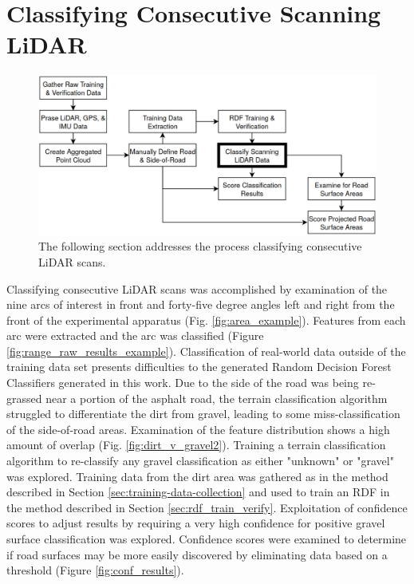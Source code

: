 \documentclass[numbered,pdftex]{ohio-etd}
\begin{document}
{{	} %
		
	\section{Classifying Consecutive Scanning LiDAR}\label{sec:classify_consec_scan_lidar}{
		
		\begin{figure}[H]
			\centering
			\includegraphics[width=0.95\linewidth]{Defense_Images/test_2.png}
			\caption[Classifying Consecutive LiDAR Scans Flowchart Context]{The following section addresses the process classifying consecutive LiDAR scans.}
			\label{fig:test_2.png}
		\end{figure}
			
		{Classifying consecutive LiDAR scans was accomplished by examination of the nine arcs of interest in front and forty-five degree angles left and right from the front of the experimental apparatus (Fig. \ref{fig:area_example}). Features from each arc were extracted and the arc was classified (Figure \ref{fig:range_raw_results_example}). Classification of real-world data outside of the training data set presents difficulties to the generated Random Decision Forest Classifiers generated in this work. Due to the side of the road was being re-grassed near a portion of the asphalt road, the terrain classification algorithm struggled to differentiate the dirt from gravel, leading to some miss-classification of the side-of-road areas. Examination of the feature distribution shows a high amount of overlap (Fig. \ref{fig:dirt_v_gravel2}). Training a terrain classification algorithm to re-classify any gravel classification as either "unknown" or "gravel" was explored. Training data from the dirt area was gathered as in the method described in Section \ref{sec:training-data-collection} and used to train an RDF in the method described in Section \ref{sec:rdf_train_verify}. Exploitation of confidence scores to adjust results by requiring a very high confidence for positive gravel surface classification was explored. Confidence scores were examined to determine if road surfaces may be more easily discovered by eliminating data based on a threshold (Figure \ref{fig:conf_results}). }
		
}}
\end{document}
